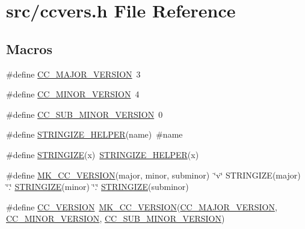 \hypertarget{a00189}{\section{src/ccvers.h File Reference}
\label{a00189}
}
\subsection*{Macros}
\begin{DoxyCompactItemize}
\item 
\#define \hyperlink{a00189_a0604b99b834eb0b0baa1e5de2050234e}{C\-C\-\_\-\-M\-A\-J\-O\-R\-\_\-\-V\-E\-R\-S\-I\-O\-N}~3
\item 
\#define \hyperlink{a00189_ac251c58b2bbaf4736e14ed427ce58dd9}{C\-C\-\_\-\-M\-I\-N\-O\-R\-\_\-\-V\-E\-R\-S\-I\-O\-N}~4
\item 
\#define \hyperlink{a00189_ae902f8a61969f79ba5f60dbaf33326d4}{C\-C\-\_\-\-S\-U\-B\-\_\-\-M\-I\-N\-O\-R\-\_\-\-V\-E\-R\-S\-I\-O\-N}~0
\item 
\#define \hyperlink{a00189_aa61f684e4f1dcb884dbe760bef3a0879}{S\-T\-R\-I\-N\-G\-I\-Z\-E\-\_\-\-H\-E\-L\-P\-E\-R}(name)~\#name
\item 
\#define \hyperlink{a00189_a3428692efe6051ef30016ffde1a9f7bb}{S\-T\-R\-I\-N\-G\-I\-Z\-E}(x)~\hyperlink{a00189_aa61f684e4f1dcb884dbe760bef3a0879}{S\-T\-R\-I\-N\-G\-I\-Z\-E\-\_\-\-H\-E\-L\-P\-E\-R}(x)
\item 
\#define \hyperlink{a00189_a1c418778edfc73c560f3cf6a1e10de05}{M\-K\-\_\-\-C\-C\-\_\-\-V\-E\-R\-S\-I\-O\-N}(major, minor, subminor)~\char`\"{}v\char`\"{} S\-T\-R\-I\-N\-G\-I\-Z\-E(major) \char`\"{}.\char`\"{} \hyperlink{a00189_a3428692efe6051ef30016ffde1a9f7bb}{S\-T\-R\-I\-N\-G\-I\-Z\-E}(minor) \char`\"{}.\char`\"{} \hyperlink{a00189_a3428692efe6051ef30016ffde1a9f7bb}{S\-T\-R\-I\-N\-G\-I\-Z\-E}(subminor)
\item 
\#define \hyperlink{a00189_acfeef8a3884b70434211cd2e63c2852b}{C\-C\-\_\-\-V\-E\-R\-S\-I\-O\-N}~\hyperlink{a00189_a1c418778edfc73c560f3cf6a1e10de05}{M\-K\-\_\-\-C\-C\-\_\-\-V\-E\-R\-S\-I\-O\-N}(\hyperlink{a00189_a0604b99b834eb0b0baa1e5de2050234e}{C\-C\-\_\-\-M\-A\-J\-O\-R\-\_\-\-V\-E\-R\-S\-I\-O\-N}, \hyperlink{a00189_ac251c58b2bbaf4736e14ed427ce58dd9}{C\-C\-\_\-\-M\-I\-N\-O\-R\-\_\-\-V\-E\-R\-S\-I\-O\-N}, \hyperlink{a00189_ae902f8a61969f79ba5f60dbaf33326d4}{C\-C\-\_\-\-S\-U\-B\-\_\-\-M\-I\-N\-O\-R\-\_\-\-V\-E\-R\-S\-I\-O\-N})
\end{DoxyCompactItemize}


